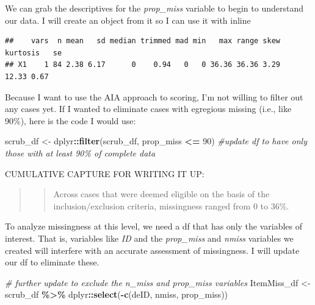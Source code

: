 \documentclass[
  11pt,
]{book}
\newenvironment{Shaded}{\begin{snugshade}}{\end{snugshade}}
\newcommand{\CommentTok}[1]{\textcolor[rgb]{0.37,0.37,0.37}{\textit{#1}}}
\newcommand{\DecValTok}[1]{\textcolor[rgb]{0.06,0.06,0.06}{#1}}
\newcommand{\FunctionTok}[1]{\textcolor[rgb]{0.27,0.27,0.27}{\textbf{#1}}}
\newcommand{\NormalTok}[1]{#1}
\newcommand{\OtherTok}[1]{\textcolor[rgb]{0.37,0.37,0.37}{#1}}
\newcommand{\SpecialCharTok}[1]{\textcolor[rgb]{0.43,0.43,0.43}{\textbf{#1}}}
\begin{document}
We can grab the descriptives for the \emph{prop\_miss} variable to begin to understand our data. I will create an object from it so I can use it with inline

\begin{Shaded}
\end{Shaded}

\begin{verbatim}
##    vars  n mean   sd median trimmed mad min   max range skew kurtosis   se
## X1    1 84 2.38 6.17      0    0.94   0   0 36.36 36.36 3.29    12.33 0.67
\end{verbatim}

Because I want to use the AIA approach to scoring, I'm not willing to filter out any cases yet. If I wanted to eliminate cases with egregious missing (i.e., like 90\%), here is the code I would use:

\begin{Shaded}
\begin{Highlighting}[]
\NormalTok{scrub\_df }\OtherTok{\textless{}{-}}\NormalTok{ dplyr}\SpecialCharTok{::}\FunctionTok{filter}\NormalTok{(scrub\_df, prop\_miss }\SpecialCharTok{\textless{}=} \DecValTok{90}\NormalTok{)  }\CommentTok{\#update df to have only those with at least 90\% of complete data}
\end{Highlighting}
\end{Shaded}

CUMULATIVE CAPTURE FOR WRITING IT UP:

\begin{quote}
\begin{quote}
Across cases that were deemed eligible on the basis of the inclusion/exclusion criteria, missingness ranged from 0 to 36\%.
\end{quote}
\end{quote}

To analyze missingness at this level, we need a df that has only the variables of interest. That is, variables like \emph{ID} and the \emph{prop\_miss} and \emph{nmiss} variables we created will interfere with an accurate assessment of missingness. I will update our df to eliminate these.

\begin{Shaded}
\begin{Highlighting}[]
\CommentTok{\# further update to exclude the n\_miss and prop\_miss variables}
\NormalTok{ItemMiss\_df }\OtherTok{\textless{}{-}}\NormalTok{ scrub\_df }\SpecialCharTok{\%\textgreater{}\%}
\NormalTok{    dplyr}\SpecialCharTok{::}\FunctionTok{select}\NormalTok{(}\SpecialCharTok{{-}}\FunctionTok{c}\NormalTok{(deID, nmiss, prop\_miss))}
\end{Highlighting}
\end{Shaded}
\end{document}

